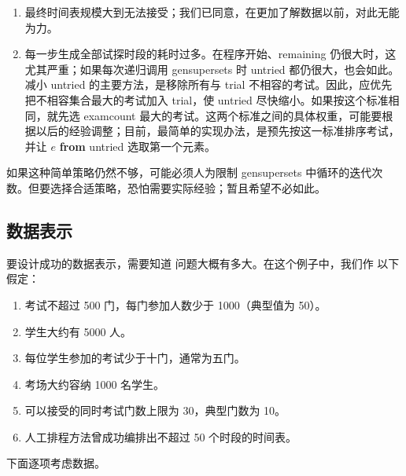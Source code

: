 \begin{enumerate}[wide, nosep, label=(\arabic*)]
	\item 最终时间表规模大到无法接受；我们已同意，在更加了解数据以前，对此无能为力。

	\item 每一步生成全部试探时段的耗时过多。在程序开始、remaining 仍很大时，这尤其严重；如果每次递归调用 gensupersets 时 untried 都仍很大，也会如此。减小 untried 的主要方法，是移除所有与 trial 不相容的考试。因此，应优先把不相容集合最大的考试加入 trial，使 untried 尽快缩小。如果按这个标准相同，就先选 examcount 最大的考试。这两个标准之间的具体权重，可能要根据以后的经验调整；目前，最简单的实现办法，是预先按这一标准排序考试，并让 $e$ \textbf{from} untried 选取第一个元素。
\end{enumerate}

如果这种简单策略仍然不够，可能必须人为限制 gensupersets 中循环的迭代次数。但要选择合适策略，恐怕需要实际经验；暂且希望不必如此。

\subsection{数据表示}

要设计成功的数据表示，需要知道
问题大概有多大。在这个例子中，我们作
以下假定：

\begin{enumerate}[wide, nosep, label=(\arabic*)]
	\item 考试不超过 500 门，每门参加人数少于 1000（典型值为 50）。
	\item 学生大约有 5000 人。
	\item 每位学生参加的考试少于十门，通常为五门。
	\item 考场大约容纳 1000 名学生。
	\item 可以接受的同时考试门数上限为 30，典型门数为 10。
	\item 人工排程方法曾成功编排出不超过 50 个时段的时间表。
\end{enumerate}

下面逐项考虑数据。

